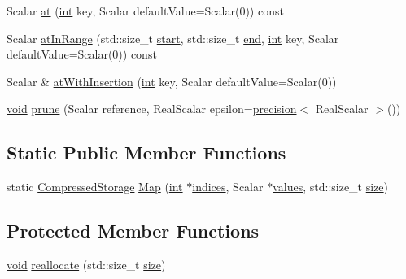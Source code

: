 \begin{DoxyCompactItemize}
\item 
Scalar \hyperlink{class_compressed_storage_a383e779f4731ac6ef27f3ca6e353d844}{at} (\hyperlink{ioapi_8h_a787fa3cf048117ba7123753c1e74fcd6}{int} key, Scalar default\-Value=Scalar(0)) const 
\item 
Scalar \hyperlink{class_compressed_storage_afab45cacf2a38ed90640df3f2970dc55}{at\-In\-Range} (std\-::size\-\_\-t \hyperlink{glext_8h_a13be19455586e95d5a42ed8f054afad2}{start}, std\-::size\-\_\-t \hyperlink{glext_8h_a432111147038972f06e049e18a837002}{end}, \hyperlink{ioapi_8h_a787fa3cf048117ba7123753c1e74fcd6}{int} key, Scalar default\-Value=Scalar(0)) const 
\item 
Scalar \& \hyperlink{class_compressed_storage_a74c7a46d07a619a7085bda090388b183}{at\-With\-Insertion} (\hyperlink{ioapi_8h_a787fa3cf048117ba7123753c1e74fcd6}{int} key, Scalar default\-Value=Scalar(0))
\item 
\hyperlink{group___u_a_v_objects_plugin_ga444cf2ff3f0ecbe028adce838d373f5c}{void} \hyperlink{class_compressed_storage_a28794f65eb8b613129fe86c91b7c2311}{prune} (Scalar reference, Real\-Scalar epsilon=\hyperlink{_math_functions_8h_a3dc1c65cf9dc9b5a7ee66472d0ae83e1}{precision}$<$ Real\-Scalar $>$())
\end{DoxyCompactItemize}
\subsection*{Static Public Member Functions}
\begin{DoxyCompactItemize}
\item 
static \hyperlink{class_compressed_storage}{Compressed\-Storage} \hyperlink{class_compressed_storage_a51cd1cdb5559f814ec5f637e0112104b}{Map} (\hyperlink{ioapi_8h_a787fa3cf048117ba7123753c1e74fcd6}{int} $\ast$\hyperlink{glext_8h_adbd1b09d60fa0a569e6873aa161d44c7}{indices}, Scalar $\ast$\hyperlink{glext_8h_a300a8ed5fb9490aa35713406ec0412df}{values}, std\-::size\-\_\-t \hyperlink{glext_8h_a014d89bd76f74ef3a29c8f04b473eb76}{size})
\end{DoxyCompactItemize}
\subsection*{Protected Member Functions}
\begin{DoxyCompactItemize}
\item 
\hyperlink{group___u_a_v_objects_plugin_ga444cf2ff3f0ecbe028adce838d373f5c}{void} \hyperlink{class_compressed_storage_acf1918ff4c926b467568fa9fc85334bb}{reallocate} (std\-::size\-\_\-t \hyperlink{glext_8h_a014d89bd76f74ef3a29c8f04b473eb76}{size})
\end{DoxyCompactItemize}

